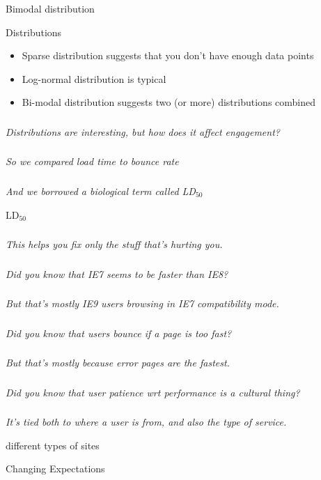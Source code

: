 \documentclass{beamer}
\newcommand{\innersplash}[1]{
  \begin{center}
    \Large \textrm{\textit{ #1 } }
  \end{center}
}
\newcommand{\splashslide}[2][{}]{
  \begin{frame}
  \frametitle{#1}
  \innersplash{#2}
  \end{frame}
}
\newcommand{\textsubscript}[1]{\ensuremath{_{\textrm{#1}}}}
\begin{document}
\begin{frame}{Bimodal distribution}
\end{frame}

\begin{frame}{Distributions}
\begin{itemize}
  \item Sparse distribution suggests that you don't have enough data points
  \item Log-normal distribution is typical
  \item Bi-modal distribution suggests two (or more) distributions combined
\end{itemize}
\end{frame}

\splashslide{Distributions are interesting, but how does it affect engagement?}

\splashslide{So we compared load time to bounce rate}

\splashslide{And we borrowed a biological term called LD\textsubscript{50}}

\begin{frame}{LD\textsubscript{50}}
\end{frame}

\splashslide{This helps you fix only the stuff that's hurting you.}

\splashslide{Did you know that IE7 seems to be faster than IE8?}
\splashslide{But that's mostly IE9 users browsing in IE7 compatibility mode.}

\splashslide{Did you know that users bounce if a page is too fast?}
\splashslide{But that's mostly because error pages are the fastest.}

\splashslide{Did you know that user patience wrt performance is a cultural thing?}
\splashslide{It's tied both to where a user is from, and also the type of service.}

\begin{frame}{different types of sites}
\end{frame}

\begin{frame}{Changing Expectations}
\end{frame}
\end{document}

